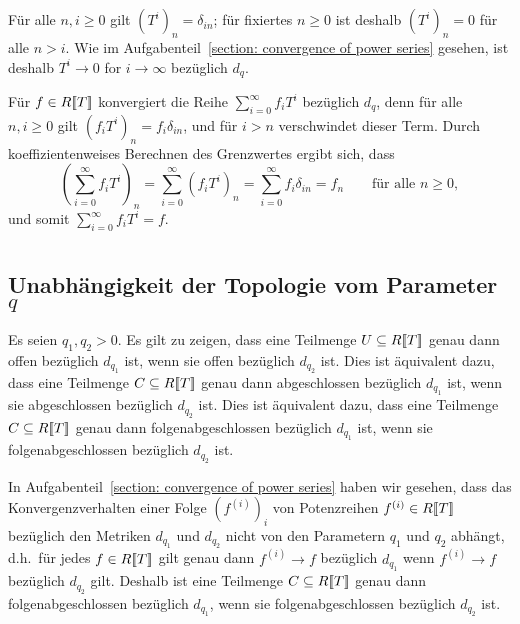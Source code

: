 \documentclass[a4paper, 10pt, numbers=noenddot]{scrartcl}
\begin{document}
\section{}

Für alle $n, i \geq 0$ gilt $(T^i)_n = \delta_{in}$;
für fixiertes $n \geq 0$ ist deshalb $(T^i)_n = 0$ für alle $n > i$.
Wie im Aufgabenteil~\ref{section: convergence of power series} gesehen, ist deshalb $T^i \to 0$ for $i \to \infty$ bezüglich $d_q$.

Für $f \in R[\![T]\!]$ konvergiert die Reihe $\sum_{i=0}^\infty f_i T^i$ bezüglich $d_q$, denn für alle $n, i \geq 0$ gilt $(f_i T^i)_n = f_i \delta_{in}$, und für $i > n$ verschwindet dieser Term.
Durch koeffizientenweises Berechnen des Grenzwertes ergibt sich, dass
\[
    \left( \sum_{i=0}^\infty f_i T^i \right)_{\!\!\!n}
  = \sum_{i=0}^\infty \left( f_i T^i \right)_n
  = \sum_{i=0}^\infty f_i \delta_{in}
  = f_n
  \qquad
  \text{für alle $n \geq 0$},
\]
und somit $\sum_{i=0}^\infty f_i T^i = f$.





\section{}



\subsection*{Unabhängigkeit der Topologie vom Parameter $q$}

Es seien $q_1, q_2 > 0$.
Es gilt zu zeigen, dass eine Teilmenge $U \subseteq R[\![T]\!]$ genau dann offen bezüglich $d_{q_1}$ ist, wenn sie offen bezüglich $d_{q_2}$ ist.
Dies ist äquivalent dazu, dass eine Teilmenge $C \subseteq R[\![T]\!]$ genau dann abgeschlossen bezüglich $d_{q_1}$ ist, wenn sie abgeschlossen bezüglich $d_{q_2}$ ist.
Dies ist äquivalent dazu, dass eine Teilmenge $C \subseteq R[\![T]\!]$ genau dann folgenabgeschlossen bezüglich $d_{q_1}$ ist, wenn sie folgenabgeschlossen bezüglich $d_{q_2}$ ist.

In Aufgabenteil~\ref{section: convergence of power series} haben wir gesehen, dass das Konvergenzverhalten einer Folge $(f^{(i)})_i$ von Potenzreihen $f^{(i)} \in R[\![T]\!]$ bezüglich den Metriken $d_{q_1}$ und $d_{q_2}$ nicht von den Parametern $q_1$ und $q_2$ abhängt, d.h.\ für jedes $f \in R[\![T]\!]$ gilt genau dann $f^{(i)} \to f$ bezüglich $d_{q_1}$ wenn $f^{(i)} \to f$ bezüglich $d_{q_2}$ gilt.
Deshalb ist eine Teilmenge $C \subseteq R[\![T]\!]$ genau dann folgenabgeschlossen bezüglich $d_{q_1}$, wenn sie folgenabgeschlossen bezüglich $d_{q_2}$ ist.
\end{document}
